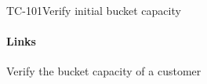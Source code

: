 \begin{testcase}{TC-101}{Verify initial bucket capacity}
\paragraph{Links} 

\begin{testprocedure}
    \stage Verify the bucket capacity of a customer
\end{testprocedure}
\end{testcase}